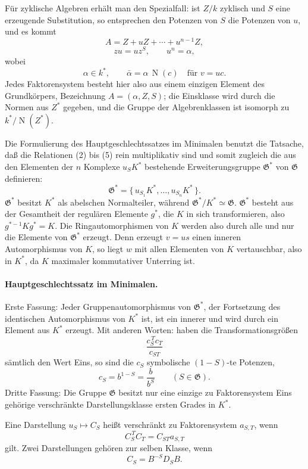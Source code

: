 \documentclass[11pt]{article}
\providecommand{\Norm}{\operatorname{N}}
\providecommand{\Gg}{\mathfrak G}
\begin{document}
Für zyklische Algebren erhält man den Spezialfall: ist \(Z/k\) zyklisch und \(S\) eine erzeugende Substitution, so entsprechen den Potenzen von \(S\) die Potenzen von \(u\), und es kommt
\[
        A=Z+uZ+\cdots+u^{n-1}Z,                              \tag{1'}
\]
\[
        zu=uz^S,\qquad u^n=\alpha,                            \tag{2'--3'}
\]
wobei
\[
        \alpha\in k^*,\qquad
        \bar\alpha=\alpha\,\Norm(c)\quad\text{für }v=uc .      \tag{4'--5'}
\]
Jedes Faktorensystem besteht hier also aus einem einzigen Element des Grundkörpers, Bezeichnung \(A=(\alpha,Z,S)\); die Einsklasse wird durch die Normen aus \(Z^*\) gegeben, und die Gruppe der Algebrenklassen ist isomorph zu \(k^*/\Norm(Z^*)\).

Die Formulierung des Hauptgeschlechtssatzes im Minimalen benutzt die Tatsache, daß die Relationen (2) bis (5) rein multiplikativ sind und somit zugleich die aus den Elementen der \(n\) Komplexe \(u_S K^*\) bestehende Erweiterungsgruppe \(\Gg^*\) von \(\Gg\) definieren:
\[
        \Gg^*=\{\,u_{S_1}K^*,\ldots,u_{S_n}K^*\,\}.            \tag{6}
\]
\(\Gg^*\) besitzt \(K^*\) als abelschen Normalteiler, während \(\Gg^*/K^*\simeq\Gg\). \(\Gg^*\) besteht aus der Gesamtheit der regulären Elemente \(g^*\), die \(K\) in sich transformieren, also \(g^{*-1}Kg^*=K\). Die Ringautomorphismen von \(K\) werden also durch alle und nur die Elemente von \(\Gg^*\) erzeugt. Denn erzeugt \(v=us\) einen inneren Automorphismus von \(K\), so liegt \(w\) mit allen Elementen von \(K\) vertauschbar, also in \(K^*\), da \(K\) maximaler kommutativer Unterring ist.

\paragraph{Hauptgeschlechtssatz im Minimalen.}
Erste Fassung: Jeder Gruppenautomorphismus von \(\Gg^*\), der Fortsetzung des identischen Automorphismus von \(K^*\) ist, ist ein innerer und wird durch ein Element aus \(K^*\) erzeugt. Mit anderen Worten: haben die Transformationsgrößen
\[
        \frac{c_S^{\,T}c_T}{c_{ST}}
\]
sämtlich den Wert Eins, so sind die \(c_S\) symbolische \((1-S)\)-te Potenzen,
\[
        c_S=b^{1-S}=\frac{b}{b^S}\qquad(S\in\Gg).
\]
Dritte Fassung: Die Gruppe \(\Gg\) besitzt nur eine einzige zu Faktorensystem Eins gehörige verschränkte Darstellungsklasse ersten Grades in \(K^*\).

Eine Darstellung \(u_S\mapsto C_S\) heißt verschränkt zu Faktorensystem \(a_{S,T}\), wenn
\[
        C_S^{\,T}C_T=C_{ST}a_{S,T}
\]
gilt. Zwei Darstellungen gehören zur selben Klasse, wenn
\[
        C_S=B^{-S}D_SB .
\]
\end{document}
